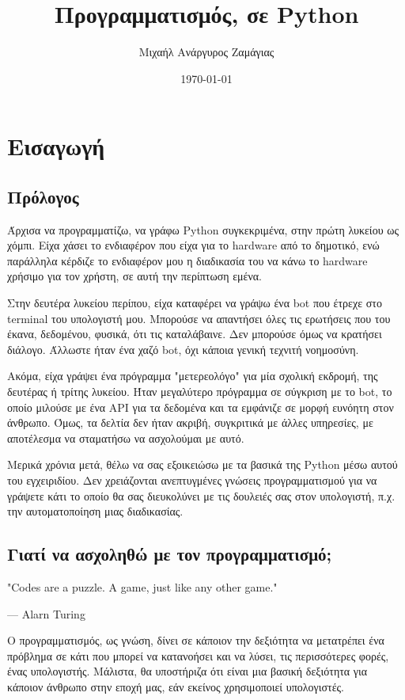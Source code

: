 \documentclass[a4paper,14pt]{extreport}
\title{Προγραμματισμός, σε Python}
\author{Μιχαήλ Ανάργυρος Ζαμάγιας}
\date{\today}
\begin{document}
\maketitle

\tableofcontents

\chapter{Εισαγωγή}
\newpage
\section{Πρόλογος}
Άρχισα να προγραμματίζω, να γράφω Python συγκεκριμένα, στην πρώτη λυκείου ως χόμπι. Είχα χάσει το ενδιαφέρον που είχα για το hardware από το δημοτικό, ενώ παράλληλα κέρδιζε το ενδιαφέρον μου η διαδικασία του να κάνω το hardware χρήσιμο για τον χρήστη, σε αυτή την περίπτωση εμένα.

Στην δευτέρα λυκείου περίπου, είχα καταφέρει να γράψω ένα bot που έτρεχε στο terminal του υπολογιστή μου. Μπορούσε να απαντήσει όλες τις ερωτήσεις που του έκανα, δεδομένου, φυσικά, ότι τις καταλάβαινε. Δεν μπορούσε όμως να κρατήσει διάλογο. Άλλωστε ήταν ένα χαζό bot, όχι κάποια γενική τεχνιτή νοημοσύνη.

Ακόμα, είχα γράψει ένα πρόγραμμα "μετερεολόγο" για μία σχολική εκδρομή, της δευτέρας ή τρίτης λυκείου. Ήταν μεγαλύτερο πρόγραμμα σε σύγκριση με το bot, το  οποίο μιλούσε με ένα API για τα δεδομένα και τα εμφάνιζε σε μορφή ευνόητη στον άνθρωπο. Όμως, τα δελτία δεν ήταν ακριβή, συγκριτικά με άλλες υπηρεσίες, με αποτέλεσμα να σταματήσω να ασχολούμαι με αυτό.

Μερικά χρόνια μετά, θέλω να σας εξοικειώσω με τα βασικά της Python μέσω αυτού του εγχειριδίου. Δεν χρειάζονται ανεπτυγμένες γνώσεις προγραμματισμού για να γράψετε κάτι το οποίο θα σας διευκολύνει με τις δουλειές σας στον υπολογιστή, π.χ. την αυτοματοποίηση μιας διαδικασίας.
\section{Γιατί να ασχοληθώ με τον προγραμματισμό;}

\epigraph{"Codes are a puzzle. A game, just like any other game."}{— Alarn Turing}
Ο προγραμματισμός, ως γνώση, δίνει σε κάποιον την δεξιότητα να
μετατρέπει ένα πρόβλημα σε κάτι που μπορεί να κατανοήσει και να λύσει,
τις περισσότερες φορές, ένας υπολογιστής. Μάλιστα, θα υποστήριζα ότι
είναι μια βασική δεξιότητα για κάποιον άνθρωπο στην εποχή μας,
εάν εκείνος χρησιμοποιεί υπολογιστές.
\end{document}
